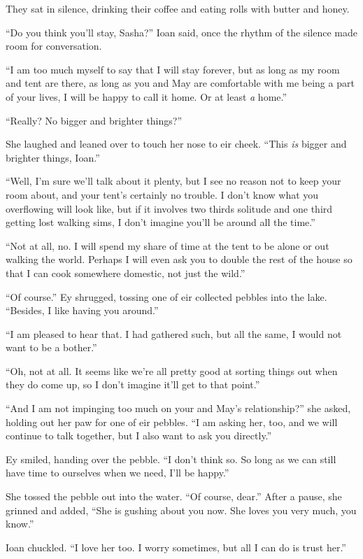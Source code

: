 They sat in silence, drinking their coffee and eating rolls with butter and honey.

``Do you think you'll stay, Sasha?'' Ioan said, once the rhythm of the silence made room for conversation.

``I am too much myself to say that I will stay forever, but as long as my room and tent are there, as long as you and May are comfortable with me being a part of your lives, I will be happy to call it home. Or at least \emph{a} home.''

``Really? No bigger and brighter things?''

She laughed and leaned over to touch her nose to eir cheek. ``This \emph{is} bigger and brighter things, Ioan.''

``Well, I'm sure we'll talk about it plenty, but I see no reason not to keep your room about, and your tent's certainly no trouble. I don't know what you overflowing will look like, but if it involves two thirds solitude and one third getting lost walking sims, I don't imagine you'll be around all the time.''

``Not at all, no. I will spend my share of time at the tent to be alone or out walking the world. Perhaps I will even ask you to double the rest of the house so that I can cook somewhere domestic, not just the wild.''

``Of course.'' Ey shrugged, tossing one of eir collected pebbles into the lake. ``Besides, I like having you around.''

``I am pleased to hear that. I had gathered such, but all the same, I would not want to be a bother.''

``Oh, not at all. It seems like we're all pretty good at sorting things out when they do come up, so I don't imagine it'll get to that point.''

``And I am not impinging too much on your and May's relationship?'' she asked, holding out her paw for one of eir pebbles. ``I am asking her, too, and we will continue to talk together, but I also want to ask you directly.''

Ey smiled, handing over the pebble. ``I don't think so. So long as we can still have time to ourselves when we need, I'll be happy.''

She tossed the pebble out into the water. ``Of course, dear.'' After a pause, she grinned and added, ``She is gushing about you now. She loves you very much, you know.''

Ioan chuckled. ``I love her too. I worry sometimes, but all I can do is trust her.''

